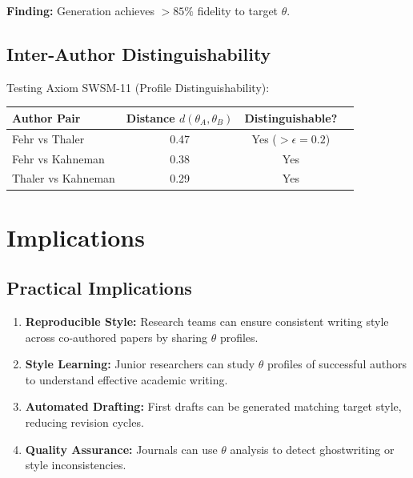 \textbf{Finding:} Generation achieves $>85\%$ fidelity to target $\theta$.

\subsection{Inter-Author Distinguishability}

Testing Axiom SWSM-11 (Profile Distinguishability):

\begin{center}
\begin{tabular}{lccc}
\toprule
Author Pair & Distance $d(\theta_A, \theta_B)$ & Distinguishable? \\
\midrule
Fehr vs Thaler & 0.47 & Yes ($> \epsilon = 0.2$) \\
Fehr vs Kahneman & 0.38 & Yes \\
Thaler vs Kahneman & 0.29 & Yes \\
\bottomrule
\end{tabular}
\end{center}


\section{Implications}
\label{sec:sw-implications}

\subsection{Practical Implications}

\begin{enumerate}
    \item \textbf{Reproducible Style:} Research teams can ensure consistent writing style across co-authored papers by sharing $\theta$ profiles.
    \item \textbf{Style Learning:} Junior researchers can study $\theta$ profiles of successful authors to understand effective academic writing.
    \item \textbf{Automated Drafting:} First drafts can be generated matching target style, reducing revision cycles.
    \item \textbf{Quality Assurance:} Journals can use $\theta$ analysis to detect ghostwriting or style inconsistencies.
\end{enumerate}

